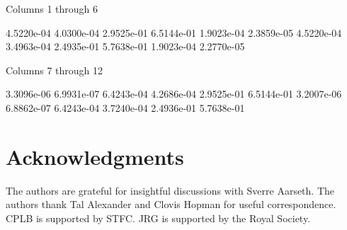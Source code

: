 \documentclass[useAMS,usedcolumn,usegraphicx,usenatbib]{mn2e}
\begin{document}
  Columns 1 through 6

   4.5220e-04   4.0300e-04   2.9525e-01   6.5144e-01   1.9023e-04   2.3859e-05
   4.5220e-04   3.4963e-04   2.4935e-01   5.7638e-01   1.9023e-04   2.2770e-05

  Columns 7 through 12

   3.3096e-06   6.9931e-07   6.4243e-04   4.2686e-04   2.9525e-01   6.5144e-01
   3.2007e-06   6.8862e-07   6.4243e-04   3.7240e-04   2.4936e-01   5.7638e-01

\section*{Acknowledgments}
The authors are grateful for insightful discussions with Sverre Aarseth. The authors thank Tal Alexander and Clovis Hopman for useful correspondence. CPLB is supported by STFC. JRG is supported by the Royal Society.




\appendix
\end{document}
